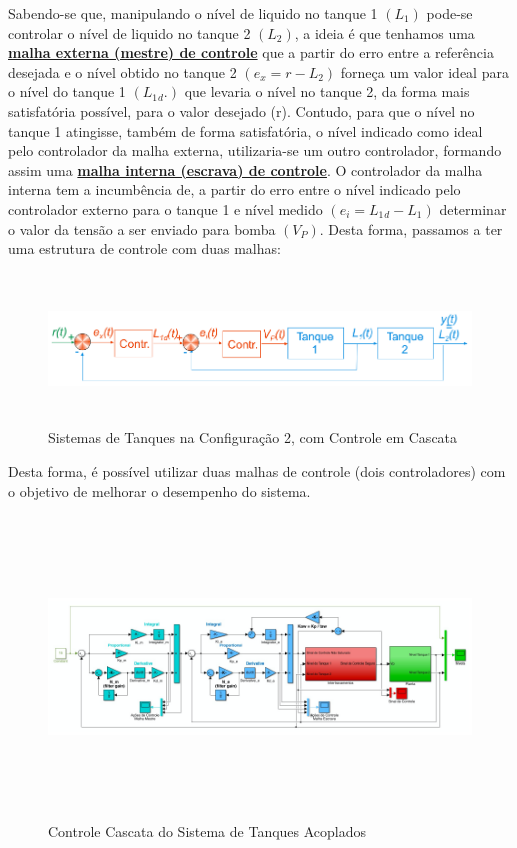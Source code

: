 \hspace{4ex}Sabendo-se que, manipulando o nível de liquido no tanque 1 \((L_1)\) pode-se controlar o nível de liquido
no tanque 2 \((L_2)\), a ideia é que tenhamos uma \textbf{\underline{malha externa (mestre) de controle}} que a partir do erro entre
a referência desejada e o nível obtido no tanque 2 \((e_x=r-L_2)\) forneça um valor ideal para o nível do tanque 1
\((L_1{}_d.)\) que levaria o nível no tanque 2, da forma mais satisfatória possível, para o valor desejado (r). Contudo,
para que o nível no tanque 1 atingisse, também de forma satisfatória, o nível indicado como ideal pelo
controlador da malha externa, utilizaria-se um outro controlador, formando assim uma \textbf{\underline{malha interna (escrava) de controle}}. O controlador da malha interna tem a incumbência de, a partir do erro entre o nível
indicado pelo controlador externo para o tanque 1 e nível medido \((e_i=L_1{}_d-L_1)\) determinar o valor da tensão
a ser enviado para bomba \((V_P)\). Desta forma, passamos a ter uma estrutura de controle com duas malhas:

\begin{figure}[h]
    \centering
    \includegraphics[width=15cm, height=4cm]{images/roteiro c/img ref teorico/config2_controle_cascata.PNG}
    \caption{Sistemas de Tanques na Configuração 2, com Controle em Cascata}
    \label{fig:config2_controle_cascata}
\end{figure}

\newpage

\hspace{4ex}Desta forma, é possível utilizar duas malhas de controle (dois controladores) com o objetivo de melhorar o desempenho do sistema.

\begin{figure}[h]
    \centering
    \includegraphics[width=18cm, height=8cm]{images/roteiro c/img ref teorico/controle_cascata.PNG}
    \caption{Controle Cascata do Sistema de Tanques Acoplados}
    \label{fig:controle_cascata}
\end{figure}

